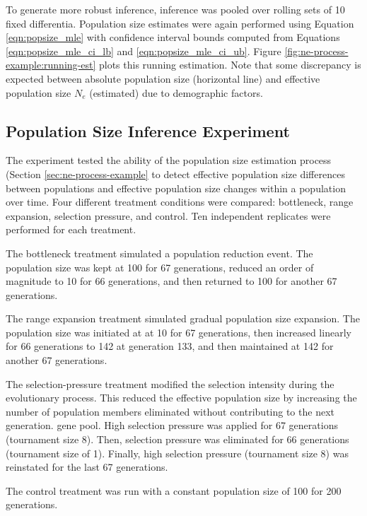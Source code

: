 To generate more robust inference, inference was pooled over rolling sets of 10 fixed differentia.
Population size estimates were again performed using Equation \ref{eqn:popsize_mle} with confidence interval bounds computed from Equations \ref{eqn:popsize_mle_ci_lb} and \ref{eqn:popsize_mle_ci_ub}.
Figure \ref{fig:ne-process-example:running-est} plots this running estimation.
Note that some discrepancy is expected between absolute population size (horizontal line) and effective population size $N_e$ (estimated) due to demographic factors.

\subsection{Population Size Inference Experiment}
\label{sec:population-size-inference-experiments}

The experiment tested the ability of the population size estimation process (Section \ref{sec:ne-process-example} to detect effective population size differences between populations and effective population size changes within a population over time.
Four different treatment conditions were compared: bottleneck, range expansion, selection pressure, and control.
Ten independent replicates were performed for each treatment.

The bottleneck treatment simulated a population reduction event.
The population size was kept at 100 for 67 generations, reduced an order of magnitude to 10 for 66 generations, and then returned to 100 for another 67 generations.

The range expansion treatment simulated gradual population size expansion.
The population size was initiated at at 10 for 67 generations, then increased linearly for 66 generations to 142 at generation 133, and then maintained at 142 for another 67 generations.

The selection-pressure treatment modified the selection intensity during the evolutionary process.
This reduced the effective population size by increasing the number of population members eliminated without contributing to the next generation. gene pool.
High selection pressure was applied for 67 generations (tournament size 8). Then, selection pressure was eliminated for 66 generations (tournament size of 1).
Finally, high selection pressure (tournament size 8) was reinstated for the last 67 generations.

The control treatment was run with a constant population size of 100 for 200 generations.

